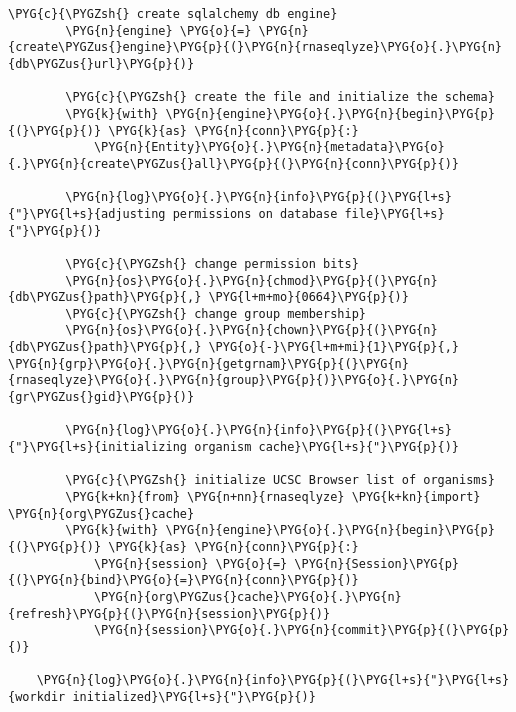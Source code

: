 \begin{Verbatim}[commandchars=\\\{\}]
        \PYG{c}{\PYGZsh{} create sqlalchemy db engine}
        \PYG{n}{engine} \PYG{o}{=} \PYG{n}{create\PYGZus{}engine}\PYG{p}{(}\PYG{n}{rnaseqlyze}\PYG{o}{.}\PYG{n}{db\PYGZus{}url}\PYG{p}{)}

        \PYG{c}{\PYGZsh{} create the file and initialize the schema}
        \PYG{k}{with} \PYG{n}{engine}\PYG{o}{.}\PYG{n}{begin}\PYG{p}{(}\PYG{p}{)} \PYG{k}{as} \PYG{n}{conn}\PYG{p}{:}
            \PYG{n}{Entity}\PYG{o}{.}\PYG{n}{metadata}\PYG{o}{.}\PYG{n}{create\PYGZus{}all}\PYG{p}{(}\PYG{n}{conn}\PYG{p}{)}

        \PYG{n}{log}\PYG{o}{.}\PYG{n}{info}\PYG{p}{(}\PYG{l+s}{"}\PYG{l+s}{adjusting permissions on database file}\PYG{l+s}{"}\PYG{p}{)}

        \PYG{c}{\PYGZsh{} change permission bits}
        \PYG{n}{os}\PYG{o}{.}\PYG{n}{chmod}\PYG{p}{(}\PYG{n}{db\PYGZus{}path}\PYG{p}{,} \PYG{l+m+mo}{0664}\PYG{p}{)}
        \PYG{c}{\PYGZsh{} change group membership}
        \PYG{n}{os}\PYG{o}{.}\PYG{n}{chown}\PYG{p}{(}\PYG{n}{db\PYGZus{}path}\PYG{p}{,} \PYG{o}{-}\PYG{l+m+mi}{1}\PYG{p}{,} \PYG{n}{grp}\PYG{o}{.}\PYG{n}{getgrnam}\PYG{p}{(}\PYG{n}{rnaseqlyze}\PYG{o}{.}\PYG{n}{group}\PYG{p}{)}\PYG{o}{.}\PYG{n}{gr\PYGZus{}gid}\PYG{p}{)}

        \PYG{n}{log}\PYG{o}{.}\PYG{n}{info}\PYG{p}{(}\PYG{l+s}{"}\PYG{l+s}{initializing organism cache}\PYG{l+s}{"}\PYG{p}{)}

        \PYG{c}{\PYGZsh{} initialize UCSC Browser list of organisms}
        \PYG{k+kn}{from} \PYG{n+nn}{rnaseqlyze} \PYG{k+kn}{import} \PYG{n}{org\PYGZus{}cache}
        \PYG{k}{with} \PYG{n}{engine}\PYG{o}{.}\PYG{n}{begin}\PYG{p}{(}\PYG{p}{)} \PYG{k}{as} \PYG{n}{conn}\PYG{p}{:}
            \PYG{n}{session} \PYG{o}{=} \PYG{n}{Session}\PYG{p}{(}\PYG{n}{bind}\PYG{o}{=}\PYG{n}{conn}\PYG{p}{)}
            \PYG{n}{org\PYGZus{}cache}\PYG{o}{.}\PYG{n}{refresh}\PYG{p}{(}\PYG{n}{session}\PYG{p}{)}
            \PYG{n}{session}\PYG{o}{.}\PYG{n}{commit}\PYG{p}{(}\PYG{p}{)}

    \PYG{n}{log}\PYG{o}{.}\PYG{n}{info}\PYG{p}{(}\PYG{l+s}{"}\PYG{l+s}{workdir initialized}\PYG{l+s}{"}\PYG{p}{)}
\end{Verbatim}


